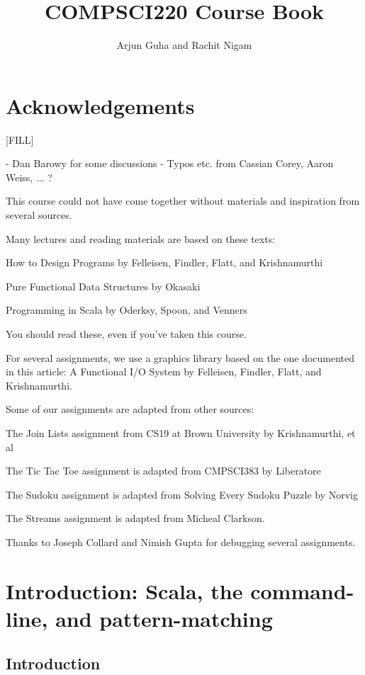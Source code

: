 \documentclass[9pt]{extbook}
\title{COMPSCI220 Course Book}
\author{Arjun Guha and Rachit Nigam}
\begin{document}
\maketitle
\tableofcontents

\chapter{Acknowledgements}

[FILL]

- Dan Barowy for some discussions
- Typos etc. from Cassian Corey, Aaron Weiss, ... ?

This course could not have come together without materials and inspiration from
several sources.

Many lectures and reading materials are based on these texts:

How to Design Programs by Felleisen, Findler, Flatt, and Krishnamurthi

Pure Functional Data Structures by Okasaki

Programming in Scala by Oderksy, Spoon, and Venners

You should read these, even if you’ve taken this course.

For several assignments, we use a graphics library based on the one documented in this article: A Functional I/O System by Felleisen, Findler, Flatt, and Krishnamurthi.

Some of our assignments are adapted from other sources:

The Join Lists assignment from CS19 at Brown University by Krishnamurthi, et al

The Tic Tac Toe assignment is adapted from CMPSCI383 by Liberatore

The Sudoku assignment is adapted from Solving Every Sudoku Puzzle by Norvig

The Streams assignment is adapted from Micheal Clarkson.

Thanks to Joseph Collard and Nimish Gupta for debugging several assignments.


\chapter{Introduction: Scala, the command-line, and pattern-matching}

\section{Introduction}
\end{document}
